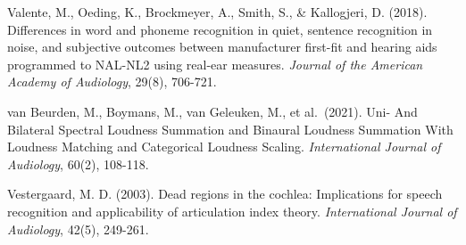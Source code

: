 \documentclass[
  12pt,
]{article}
\begin{document}
Valente, M., Oeding, K., Brockmeyer, A., Smith, S., \& Kallogjeri, D.
(2018). Differences in word and phoneme recognition in quiet, sentence
recognition in noise, and subjective outcomes between manufacturer
first-fit and hearing aids programmed to NAL-NL2 using real-ear
measures. \emph{Journal of the American Academy of Audiology}, 29(8),
706-721.

van Beurden, M., Boymans, M., van Geleuken, M., et al.~(2021). Uni- And
Bilateral Spectral Loudness Summation and Binaural Loudness Summation
With Loudness Matching and Categorical Loudness Scaling.
\emph{International Journal of Audiology}, 60(2), 108-118.

Vestergaard, M. D. (2003). Dead regions in the cochlea: Implications for
speech recognition and applicability of articulation index theory.
\emph{International Journal of Audiology}, 42(5), 249-261.
\end{document}
